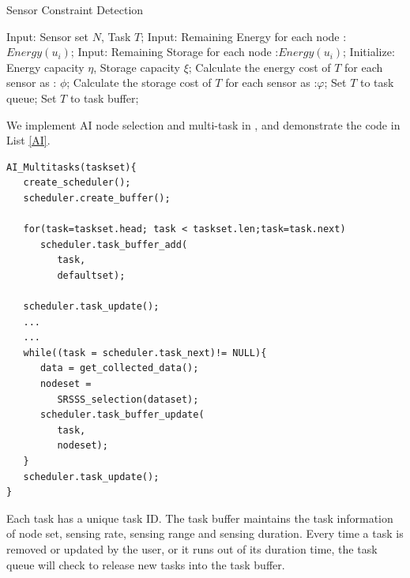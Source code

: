 \begin{algorithm}
\caption{Sensor Constraint Detection}
\label{Constraint}
\begin{algorithmic}[1]
\STATE Input: Sensor set $N$, Task $T$;
\STATE Input: Remaining Energy for each node :$Energy(u_i)$;
\STATE Input: Remaining Storage for each node :$Energy(u_i)$;
\STATE Initialize: Energy capacity $\eta$, Storage capacity $\xi$;
\STATE Calculate the energy cost of $T$ for each sensor as : $\phi$;
\STATE Calculate the storage cost of $T$ for each sensor as :$\varphi$;
   	 \STATE Set $T$ to task queue;
   	 \ENDIF
\ENDFOR
\STATE Set $T$ to task buffer;
\end{algorithmic}
\end{algorithm}
We implement AI node selection and multi-task in {\sdn}, and demonstrate the code in List \ref{AI}.


\begin{lstlisting}[language={[ANSI]C},label=AI,
	caption={An example of AI selection and Muti-tasks},
	keywordstyle=\color{blue!70},
	showstringspaces=false,
	commentstyle=\color{red!50!green!80!blue!70},
	frame=single,captionpos=t,
	rulesepcolor=\color{red!20!green!20!blue!20},
	basicstyle=\ttfamily]
AI_Multitasks(taskset){
   create_scheduler();
   scheduler.create_buffer();

   for(task=taskset.head; task < taskset.len;task=task.next)
      scheduler.task_buffer_add(
         task,
         defaultset);

   scheduler.task_update();
   ...
   ...
   while((task = scheduler.task_next)!= NULL){
      data = get_collected_data();
      nodeset =
         SRSSS_selection(dataset);
      scheduler.task_buffer_update(
         task,
         nodeset);
   }
   scheduler.task_update();
}

\end{lstlisting}

\begin{table}[htbp]
	\caption{Task Buffer}
	\label{TB}
	\centering
\end{table}

Each task has a unique task ID. The task buffer maintains the task information of node set, 
sensing rate, sensing range and sensing duration. 
Every time a task is removed or updated by the user, or it runs out of its duration time,
the task queue will check to release new tasks into the task buffer.



